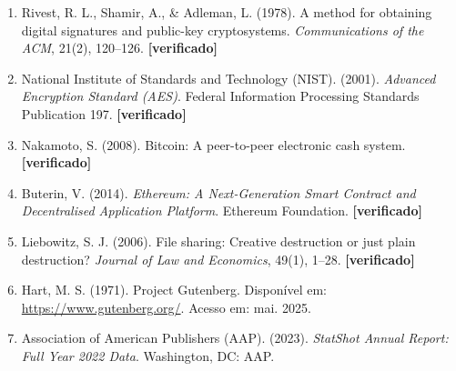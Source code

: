 \documentclass[12pt]{article}
\begin{document}
\begin{enumerate}
    \item Rivest, R. L., Shamir, A., \& Adleman, L. (1978). A method for obtaining digital signatures and public-key cryptosystems. \textit{Communications of the ACM}, 21(2), 120--126. \textbf{[verificado]}
    \item National Institute of Standards and Technology (NIST). (2001). \textit{Advanced Encryption Standard (AES)}. Federal Information Processing Standards Publication 197. \textbf{[verificado]}
    \item Nakamoto, S. (2008). Bitcoin: A peer-to-peer electronic cash system. \textbf{[verificado]}
    \item Buterin, V. (2014). \textit{Ethereum: A Next-Generation Smart Contract and Decentralised Application Platform}. Ethereum Foundation. \textbf{[verificado]}
    \item Liebowitz, S. J. (2006). File sharing: Creative destruction or just plain destruction? \textit{Journal of Law and Economics}, 49(1), 1--28. \textbf{[verificado]}
    \item Hart, M. S. (1971). Project Gutenberg. Disponível em: \url{https://www.gutenberg.org/}. Acesso em: mai. 2025.
    \item Association of American Publishers (AAP). (2023). \textit{StatShot Annual Report: Full Year 2022 Data}. Washington, DC: AAP.
\end{enumerate}
\end{document}
